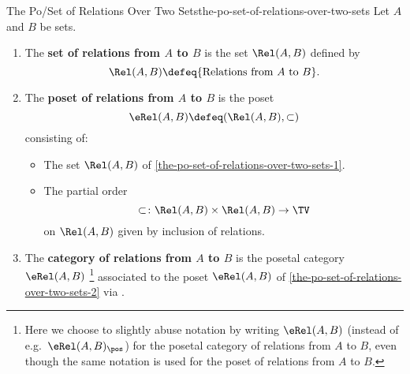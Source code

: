 \begin{definition}{The Po/Set of Relations Over Two Sets}{the-po-set-of-relations-over-two-sets}%
    Let $A$ and $B$ be sets.
    \begin{enumerate}
        \item\label{the-po-set-of-relations-over-two-sets-1}The \textbf{set of relations from $A$ to $B$} is the set $\Rel(A,B)$ defined by
            \[
                \Rel(A,B)
                \defeq
                \{%
                    \text{Relations from $A$ to $B$}%
                \}.%
            \]%
        \item\label{the-po-set-of-relations-over-two-sets-2}The \textbf{poset of relations from $A$ to $B$} is the poset %
            \[
                \eRel(A,B)%
                \defeq%
                (\Rel(A,B),\subset)%
            \]%
            consisting of:
            \begin{itemize}
                \item{}The set $\Rel(A,B)$ of \cref{the-po-set-of-relations-over-two-sets-1}.
                \item{}The partial order
                    \[
                        \subset%
                        \colon%
                        \Rel(A,B)\times\Rel(A,B)%
                        \to%
                        \TV%
                    \]%
                    on $\Rel(A,B)$ given by inclusion of relations.
            \end{itemize}
        \item\label{the-po-set-of-relations-over-two-sets-3}The \textbf{category of relations from $A$ to $B$} is the posetal category $\eRel(A,B)$%
            \footnote{%
                Here we choose to slightly abuse notation by writing $\eRel(A,B)$ (instead of e.g.\ $\eRel(A,B)_{\pos}$) for the posetal category of relations from $A$ to $B$, even though the same notation is used for the poset of relations from $A$ to $B$.
                \par\vspace*{-1.75\baselineskip}
            } %
            associated to the poset $\eRel(A,B)$ of \cref{the-po-set-of-relations-over-two-sets-2} via .%
    \end{enumerate}
\end{definition}
